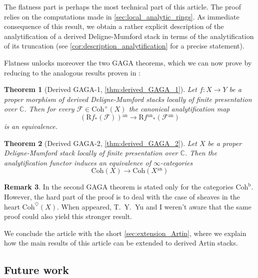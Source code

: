 \documentclass[12pt,a4paper,reqno]{amsart}
\theoremstyle{plain}
\newtheorem{thm-intro}{Theorem}
\theoremstyle{definition}
\newtheorem{rem-intro}[thm-intro]{Remark}
\theoremstyle{remark}
\numberwithin{equation}{section}
\begin{document}
The flatness part is perhaps the most technical part of this article. The proof relies on the computations made in \cref{sec:local_analytic_rings}.
As immediate consequence of this result, we obtain a rather explicit description of the analytification of a derived {Deligne-Mumford\xspace} stack in terms of the analytification of its truncation (see \cref{cor:description_analytification} for a precise statement).

Flatness unlocks moreover the two GAGA theorems, which we can now prove by reducing to the analogous results proven in \cite{Porta_Yu_Higher_analytic_stacks_2014}:

\begin{thm-intro}[{Derived GAGA-1, \cref{thm:derived_GAGA_1}}]
	Let $f \colon X \to Y$ be a proper morphism of derived {Deligne-Mumford\xspace} stacks locally of finite presentation over $\mathbb C$.
	Then for every ${\mathcal F} \in {\mathrm{Coh}}^+(X)$ the canonical analytification map
	\[ ({\mathrm R} f_*({\mathcal F})){^\mathrm{an}} \to {\mathrm R} f{^\mathrm{an}}_*({\mathcal F}{^\mathrm{an}}) \]
	is an equivalence.
\end{thm-intro}

\begin{thm-intro}[{Derived GAGA-2, \cref{thm:derived_GAGA_2}}]
	Let $X$ be a proper {Deligne-Mumford\xspace} stack locally of finite presentation over $\mathbb C$.
	Then the analytification functor induces an equivalence of $\infty$-categories
	\[ {\mathrm{Coh}}(X) \to {\mathrm{Coh}}(X{^\mathrm{an}}) \]
\end{thm-intro}

\begin{rem-intro}
	In \cite{Porta_Yu_Higher_analytic_stacks_2014} the second GAGA theorem is stated only for the categories ${\mathrm{Coh}^{\mathrm{b}}}$.
	However, the hard part of the proof is to deal with the case of sheaves in the heart ${\mathrm{Coh}}^\heartsuit(X)$.
	When \cite{Porta_Yu_Higher_analytic_stacks_2014} appeared, T.\ Y.\ Yu and I weren't aware that the same proof could also yield this stronger result.
\end{rem-intro}

We conclude the article with the short \cref{sec:extension_Artin}, where we explain how the main results of this article can be extended to derived Artin stacks.

\subsection*{Future work}
\end{document}
